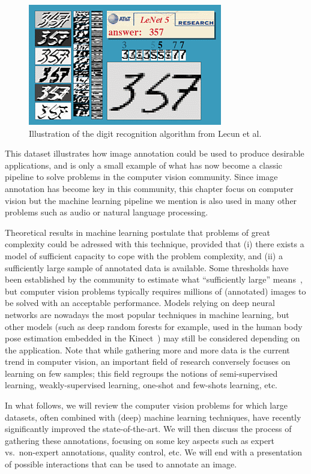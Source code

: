 \begin{figure}[ht]
\centering
\includegraphics[width=0.5\columnwidth]{assets/img/lenet-results.png}
\caption{Illustration of the digit recognition algorithm from Lecun et al.\ \cite{lecun1998gradient}}%
\label{fig:lenet}
\end{figure}

This dataset illustrates how image annotation could be used
to produce desirable applications, and is only a small example of what
has now become a classic pipeline to solve problems in the computer vision community.
Since image annotation has become key in this community,
this chapter focus on computer vision but
the machine learning pipeline we mention is also used in many other problems
such as audio or natural language processing.

Theoretical results in machine learning postulate that
problems of great complexity could be adressed with this technique,
provided that (i) there exists a model of sufficient capacity
to cope with the problem complexity,
and (ii) a sufficiently large sample of annotated data is available.
Some thresholds have been established by the community to estimate
what ``sufficiently large'' means~\cite{raudys1991small, jain198239},
but computer vision problems typically requires millions
of (annotated) images to be solved with an acceptable performance.
Models relying on deep neural networks are nowadays
the most popular techniques in machine learning,
but other models (such as deep random forests for example,
used in the human body pose estimation embedded in the Kinect~\cite{shotton2011real})
may still be considered depending on the application.
Note that while gathering more and more data is the current trend in computer vision,
an important field of research conversely focuses on learning on few samples;
this field regroups the notions of semi-supervised learning,
weakly-supervised learning, one-shot and few-shots learning, etc.

In what follows, we will review the computer vision problems for which large datasets,
often combined with (deep) machine learning techniques,
have recently significantly improved the state-of-the-art.
We will then discuss the process of gathering these annotations,
focusing on some key aspects such as expert vs.\ non-expert annotations, quality control, etc.
We will end with a presentation of possible interactions that can be used to annotate an image.

